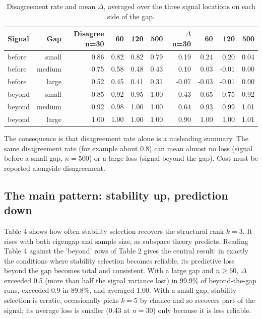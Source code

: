 \documentclass[11pt]{article}
\begin{document}
\begin{table}[!htbp]
\centering
\caption{Disagreement rate and mean $\Delta$, averaged over the three signal locations on each side of the gap.}
\scriptsize
\setlength{\tabcolsep}{3.2pt}
\begin{tabular}{@{}lrrrrrrrrr@{}}
\toprule
Signal & Gap & Disagree n=30 & 60 & 120 & 500 & $\Delta$ n=30 & 60 & 120 & 500 \\
\midrule
before & small & 0.86 & 0.82 & 0.82 & 0.79 & 0.19 & 0.24 & 0.20 & 0.04 \\
before & medium & 0.75 & 0.58 & 0.48 & 0.43 & 0.10 & 0.03 & -0.01 & 0.00 \\
before & large & 0.52 & 0.45 & 0.41 & 0.31 & -0.07 & -0.03 & -0.01 & 0.00 \\
beyond & small & 0.85 & 0.92 & 0.95 & 1.00 & 0.43 & 0.65 & 0.75 & 0.92 \\
beyond & medium & 0.92 & 0.98 & 1.00 & 1.00 & 0.64 & 0.93 & 0.99 & 1.01 \\
beyond & large & 1.00 & 1.00 & 1.00 & 1.00 & 0.90 & 1.00 & 1.00 & 1.01 \\
\bottomrule
\end{tabular}
\end{table}

The consequence is that disagreement rate alone is a misleading summary. The same disagreement rate (for example about 0.8) can mean almost no loss (signal before a small gap, $n=500$) or a large loss (signal beyond the gap). Cost must be reported alongside disagreement.\par

\subsection{The main pattern: stability up, prediction down}

Table 4 shows how often stability selection recovers the structural rank $k=3$. It rises with both eigengap and sample size, as subspace theory predicts. Reading Table 4 against the 'beyond' rows of Table 2 gives the central result: in exactly the conditions where stability selection becomes reliable, its predictive loss beyond the gap becomes total and consistent. With a large gap and $n\geq 60$, $\Delta$ exceeded 0.5 (more than half the signal variance lost) in 99.9\% of beyond-the-gap runs, exceeded 0.9 in 89.8\%, and averaged 1.00. With a small gap, stability selection is erratic, occasionally picks $k=5$ by chance and so recovers part of the signal; its average loss is smaller (0.43 at $n=30$) only because it is less reliable.\par
\end{document}
